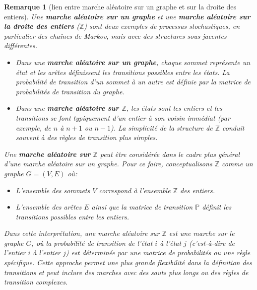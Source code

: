 \documentclass{article}
\theoremstyle{pasdepoint}
\theoremstyle{break}
\theoremstyle{pasdepoint}
\newtheorem*{remark}{Remarque}
\begin{document}
\begin{remark}[lien entre marche aléatoire sur un graphe et sur la droite des entiers]
    Une \textbf{marche aléatoire sur un graphe} et une \textbf{marche aléatoire sur la droite des entiers} (\(\mathbb{Z}\)) sont deux exemples de processus stochastiques, en particulier des chaînes de Markov, mais avec des structures sous-jacentes différentes.

    \begin{itemize}
        \item Dans une \textbf{marche aléatoire sur un graphe}, chaque sommet représente un état et les arêtes définissent les transitions possibles entre les états. La probabilité de transition d'un sommet à un autre est définie par la matrice de probabilités de transition du graphe.
        \item Dans une \textbf{marche aléatoire sur \(\mathbb{Z}\)}, les états sont les entiers et les transitions se font typiquement d'un entier à son voisin immédiat (par exemple, de \(n\) à \(n+1\) ou \(n-1\)). La simplicité de la structure de \(\mathbb{Z}\) conduit souvent à des règles de transition plus simples.
    \end{itemize}

    Une \textbf{marche aléatoire sur} \(\mathbb{Z}\) peut être considérée dans le cadre plus général d'une marche aléatoire sur un graphe. Pour ce faire, conceptualisons \(\mathbb{Z}\) comme un graphe \(G = (V, E)\) où:
    \begin{itemize}
        \item L'ensemble des sommets \(V\) correspond à l'ensemble \(\mathbb{Z}\) des entiers.
        \item L'ensemble des arêtes \(E\) ainsi que la matrice de transition \(\mathbb{P}\) définit les transitions possibles entre les entiers.
    \end{itemize}

    Dans cette interprétation, une \textit{marche aléatoire sur} \(\mathbb{Z}\) est une marche sur le graphe \(G\), où la probabilité de transition de l'état \(i\) à l'état \(j\) (c'est-à-dire de l'entier \(i\) à l'entier \(j\)) est déterminée par une matrice de probabilités ou une règle spécifique. Cette approche permet une plus grande flexibilité dans la définition des transitions et peut inclure des marches avec des sauts plus longs ou des règles de transition complexes.
\end{remark}
\end{document}

